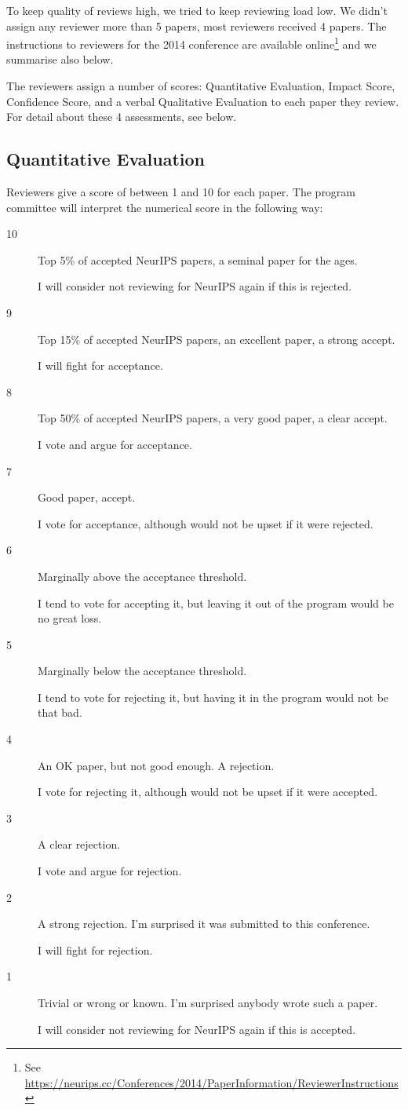 To keep quality of reviews high, we tried to keep reviewing load low. We didn't
assign any reviewer more than 5 papers, most reviewers received 4
papers.
The instructions to reviewers for the 2014 conference are 
available online\footnote{See  
\url{https://neurips.cc/Conferences/2014/PaperInformation/ReviewerInstructions}} and we summarise also below.

The reviewers assign a number of scores: Quantitative Evaluation,
Impact Score, Confidence Score, and a verbal Qualitative Evaluation to
each paper they review. For detail about these 4 assessments, see below.

\subsection*{Quantitative Evaluation}
Reviewers give a score of between 1 and 10 for each paper. The program
committee will interpret the numerical score in the following way:

\begin{description}
\item[10] Top 5\% of accepted NeurIPS papers, a seminal paper for the ages.

  I will consider not reviewing for NeurIPS again if this is rejected.
\item[9] Top 15\% of accepted NeurIPS papers, an excellent paper, a strong
  accept.

  I will fight for acceptance.
\item[8] Top 50\% of accepted NeurIPS papers, a very good paper, a clear
  accept.

  I vote and argue for acceptance.
\item[7] Good paper, accept.

  I vote for acceptance, although would not be upset if it were
  rejected.
\item[6] Marginally above the acceptance threshold.

  I tend to vote for accepting it, but leaving it out of the program
  would be no great loss.
\item[5] Marginally below the acceptance threshold.

  I tend to vote for rejecting it, but having it in the program would
  not be that bad.
\item[4] An OK paper, but not good enough. A rejection.

  I vote for rejecting it, although would not be upset if it were
  accepted.
\item[3] A clear rejection.

  I vote and argue for rejection.
\item[2] A strong rejection. I'm surprised it was submitted to this
  conference.

  I will fight for rejection.
\item[1] Trivial or wrong or known. I'm surprised anybody wrote such a
  paper.

  I will consider not reviewing for NeurIPS again if this is accepted.
\end{description}

